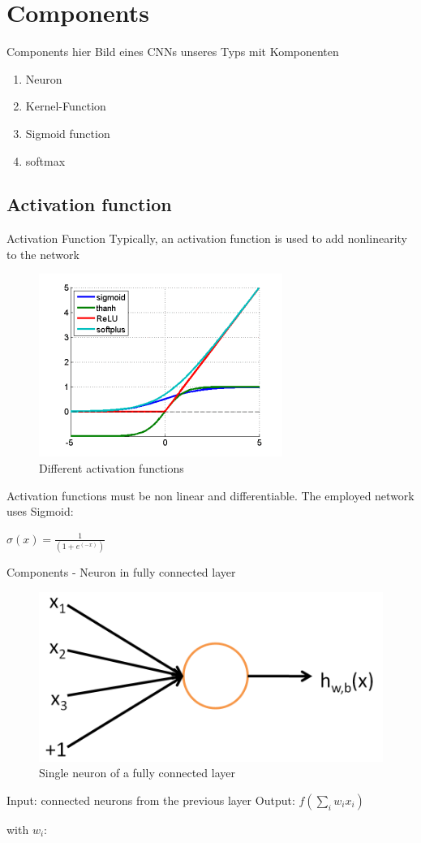 \documentclass[12pt]{beamer}
\begin{document}
\section{Components}
\begin{frame}{Components}
hier Bild eines CNNs unseres Typs mit Komponenten


\begin{enumerate}
\item Neuron
\item Kernel-Function
\item Sigmoid function
\item softmax
\end{enumerate}

\end{frame}
\subsection{Activation function}
\begin{frame}{Activation Function}
Typically, an activation function is used  to add nonlinearity to the network
\begin{figure}
\centering
\includegraphics[width = 0.4\linewidth]{images/activation_functions.png}
\caption{Different activation functions}
\label{fig:principle}
\end{figure}
Activation functions must be non linear and differentiable. \newline
The employed network uses Sigmoid:

$\sigma(x) = \frac{1}{(1+e^(-x))}$



\end{frame}


\begin{frame}{Components - Neuron in fully connected layer}

\begin{figure}
\centering
\includegraphics[width = 0.4\linewidth]{images/SingleNeuron.png}
\caption{Single neuron of a fully connected layer}
\label{fig:principle}
\end{figure}
Input: connected neurons from the previous layer \newline
Output: $f (\sum_{i}{w_i x_i})$

with \newline
$w_i$: 
\end{frame}
\end{document}
